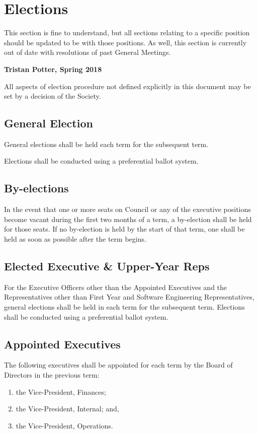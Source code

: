 \section{Elections}
\begin{annotation}
    This section is fine to understand, but all sections relating to a specific
    position should be updated to be with those positions. As well, this 
    section is currently out of date with resolutions of past General Meetings.
    
    \textbf{Tristan Potter, Spring 2018}
\end{annotation}

All aspects of election procedure not defined explicitly in this document may be
set by a decision of the Society.

\subsection{General Election}
General elections shall be held each term for the subsequent term.

Elections shall be conducted using a preferential ballot system.

\subsection{By-elections}
In the event that one or more seats on Council or any of the executive
positions become vacant during the first two months of a term, a by-election shall be held for those seats. If no by-election is held by the start of that
term, one shall be held as soon as possible after the term begins.

\subsection{Elected Executive \& Upper-Year Reps}
For the Executive Officers other than the Appointed Executives and the
Representatives other than First Year and Software Engineering Representatives,
general elections shall be held in each term for the subsequent term. Elections shall be conducted using a preferential ballot system.

\subsection{Appointed Executives}
The following executives shall be appointed for each term by the Board
of Directors in the previous term:
\begin{enumerate} 
    \item the Vice-President, Finances;
    \item the Vice-President, Internal; and,
    \item the Vice-President, Operations.
\end{enumerate}

